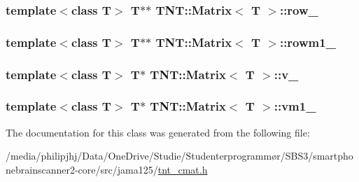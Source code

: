 \hypertarget{classTNT_1_1Matrix_a9b970ee02290aa814d67ca6e8a4ebc60}{
\subsubsection[{row\-\_\-}]{\setlength{\rightskip}{0pt plus 5cm}template$<$class T$>$ T$\ast$$\ast$ {\bf T\-N\-T\-::\-Matrix}$<$ T $>$\-::row\-\_\-\hspace{0.3cm}{\ttfamily [protected]}}}\label{classTNT_1_1Matrix_a9b970ee02290aa814d67ca6e8a4ebc60}
\hypertarget{classTNT_1_1Matrix_a099ebf68bd8eb98cda5844ca99dbf614}{
\subsubsection[{rowm1\-\_\-}]{\setlength{\rightskip}{0pt plus 5cm}template$<$class T$>$ T$\ast$$\ast$ {\bf T\-N\-T\-::\-Matrix}$<$ T $>$\-::rowm1\-\_\-\hspace{0.3cm}{\ttfamily [protected]}}}\label{classTNT_1_1Matrix_a099ebf68bd8eb98cda5844ca99dbf614}
\hypertarget{classTNT_1_1Matrix_a6a7ca17d4336b010fbde3036bbe54093}{
\subsubsection[{v\-\_\-}]{\setlength{\rightskip}{0pt plus 5cm}template$<$class T$>$ T$\ast$ {\bf T\-N\-T\-::\-Matrix}$<$ T $>$\-::v\-\_\-\hspace{0.3cm}{\ttfamily [protected]}}}\label{classTNT_1_1Matrix_a6a7ca17d4336b010fbde3036bbe54093}
\hypertarget{classTNT_1_1Matrix_a7bee192ea8a850399382ff79c9d176bf}{
\subsubsection[{vm1\-\_\-}]{\setlength{\rightskip}{0pt plus 5cm}template$<$class T$>$ T$\ast$ {\bf T\-N\-T\-::\-Matrix}$<$ T $>$\-::vm1\-\_\-\hspace{0.3cm}{\ttfamily [protected]}}}\label{classTNT_1_1Matrix_a7bee192ea8a850399382ff79c9d176bf}


The documentation for this class was generated from the following file\-:\begin{DoxyCompactItemize}
\item 
/media/philipjhj/\-Data/\-One\-Drive/\-Studie/\-Studenterprogrammør/\-S\-B\-S3/smartphonebrainscanner2-\/core/src/jama125/\hyperlink{tnt__cmat_8h}{tnt\-\_\-cmat.\-h}\end{DoxyCompactItemize}
